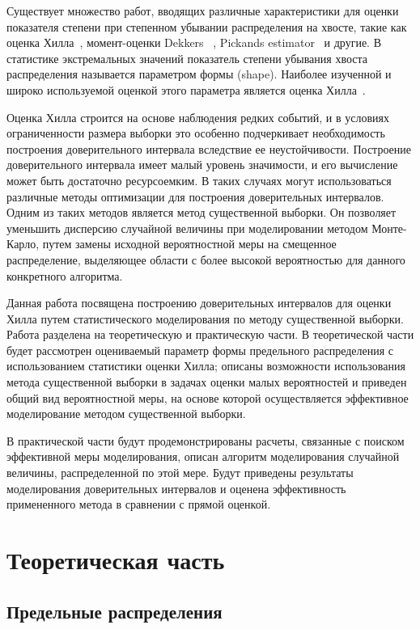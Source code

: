 \documentclass[12pt, specialist, subf, substylefile = spbu.rtx]{disser}
\begin{document}
Существует множество работ, вводящих различные характеристики для оценки показателя степени при степенном убывании распределения на хвосте, такие как оценка Хилла~\cite{Hill}, момент-оценки Dekkers ~\cite{dekkers1989}, Pickands estimator~\cite{iii1975} и другие. В статистике экстремальных значений показатель степени убывания хвоста распределения называется параметром формы (shape). Наиболее изученной и широко используемой оценкой этого параметра является оценка Хилла~\cite{Hill}.

Оценка Хилла строится на основе наблюдения редких событий, и в условиях ограниченности размера выборки это особенно подчеркивает необходимость построения доверительного интервала вследствие ее неустойчивости. Построение доверительного интервала имеет малый уровень значимости, и его вычисление может быть достаточно ресурсоемким. В таких случаях могут использоваться различные методы оптимизации для построения доверительных интервалов. Одним из таких методов является метод существенной выборки. Он позволяет уменьшить дисперсию случайной величины при моделировании методом Монте-Карло, путем замены исходной вероятностной меры на смещенное распределение, выделяющее области с более высокой вероятностью для данного конкретного алгоритма.

Данная работа посвящена построению доверительных интервалов для оценки Хилла путем статистического моделирования по методу существенной выборки. Работа разделена на теоретическую и практическую части. В теоретической части будет рассмотрен оцениваемый параметр формы предельного распределения с использованием статистики оценки Хилла; описаны возможности использования метода существенной выборки в задачах оценки малых вероятностей и приведен общий вид вероятностной меры, на основе которой осуществляется эффективное моделирование методом существенной выборки. 

В практической части будут продемонстрированы расчеты, связанные с поиском эффективной меры моделирования, описан алгоритм моделирования случайной величины, распределенной по этой мере. Будут приведены результаты моделирования доверительных интервалов и оценена эффективность примененного метода в сравнении с прямой оценкой.



\chapter{Теоретическая часть}

\section{Предельные распределения}
\end{document}

